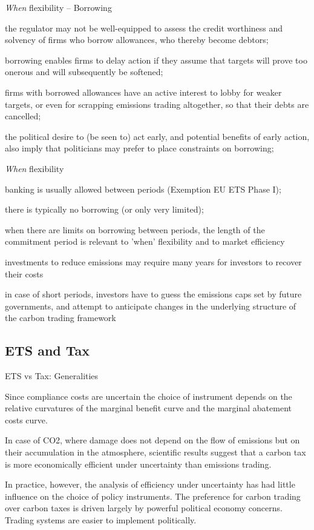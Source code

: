 {{\it When} flexibility -- Borrowing}
\item<1-> the regulator may not be well-equipped to assess the credit worthiness and
solvency of firms who borrow allowances, who thereby become debtors;
\item<2-> borrowing enables firms to delay action if they assume that targets will prove too
onerous and will subsequently be softened;
\item<3-> firms with borrowed allowances have an active interest to lobby for weaker targets,
or even for scrapping emissions trading altogether, so that their debts are cancelled;
\item<4-> the political desire to (be seen to) act early, and potential benefits of early action,
also imply that politicians may prefer to place constraints on borrowing;


{{\it When} flexibility}
\item<1-> banking is usually allowed between periods (Exemption EU ETS Phase I);
\item<2-> there is typically no borrowing (or only very limited);
\item<3-> when there are limits on borrowing between periods, the length of the commitment period is relevant to 'when' flexibility
and to market efficiency
\item investments to reduce
emissions may require many years for investors to recover their costs
\item in case of short periods, investors have to guess the emissions caps set by
future governments, and attempt to anticipate changes in the underlying structure of the
carbon trading framework

\subsection{ETS and Tax}

{ETS vs Tax: Generalities}
\item<1-> Since compliance costs are uncertain the choice of instrument depends on the relative curvatures
of the marginal benefit curve and the marginal abatement costs curve.
\item<2-> In case of CO2, where damage does not depend on the flow of emissions but on their accumulation in
the atmosphere, scientific results suggest that a carbon tax is more economically efficient under
uncertainty than emissions trading.
\item<3-> In practice, however, the analysis of efficiency
under uncertainty has had little influence on the choice of policy instruments. The preference
for carbon trading over carbon taxes is driven largely by powerful political economy concerns.
Trading systems are easier to implement politically.

